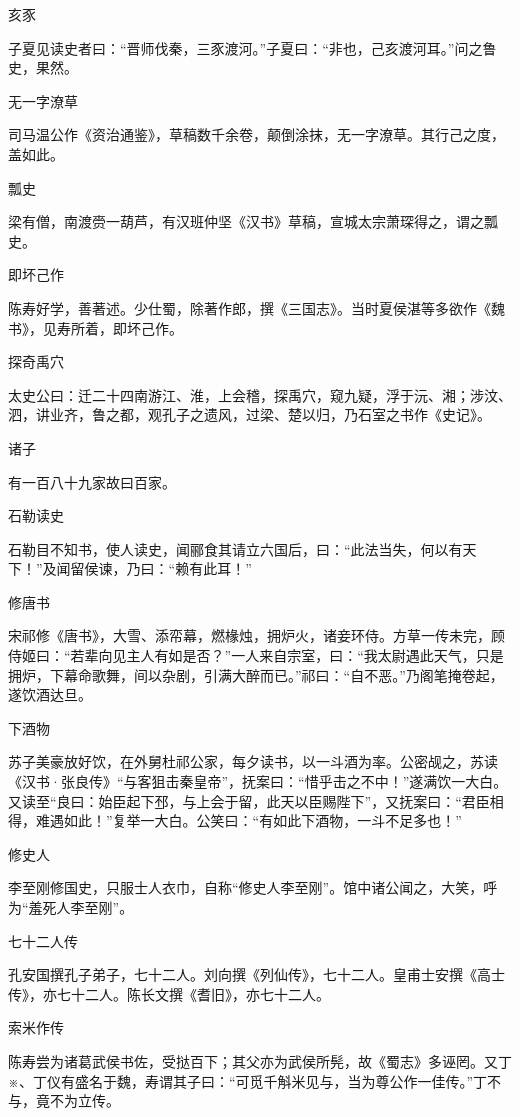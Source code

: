 \documentclass[a4paper,12pt,UTF8,twoside]{ctexbook}
\begin{document}
    亥豕
    
    子夏见读史者曰：“晋师伐秦，三豕渡河。”子夏曰：“非也，己亥渡河耳。”问之鲁史，果然。
    
    无一字潦草
    
    司马温公作《资治通鉴》，草稿数千余卷，颠倒涂抹，无一字潦草。其行己之度，盖如此。
    
    瓢史
    
    梁有僧，南渡赍一葫芦，有汉班仲坚《汉书》草稿，宣城太宗萧琛得之，谓之瓢史。
    
    即坏己作
    
    陈寿好学，善著述。少仕蜀，除著作郎，撰《三国志》。当时夏侯湛等多欲作《魏书》，见寿所着，即坏己作。
    
    探奇禹穴
    
    太史公曰：迁二十四南游江、淮，上会稽，探禹穴，窥九疑，浮于沅、湘；涉汶、泗，讲业齐，鲁之都，观孔子之遗风，过梁、楚以归，乃石室之书作《史记》。
    
    诸子
    
    有一百八十九家故曰百家。
    
    石勒读史
    
    石勒目不知书，使人读史，闻郦食其请立六国后，曰：“此法当失，何以有天下！”及闻留侯谏，乃曰：“赖有此耳！”
    
    修唐书
    
    宋祁修《唐书》，大雪、添帟幕，燃椽烛，拥炉火，诸妾环侍。方草一传未完，顾侍姬曰：“若辈向见主人有如是否？”一人来自宗室，曰：“我太尉遇此天气，只是拥炉，下幕命歌舞，间以杂剧，引满大醉而已。”祁曰：“自不恶。”乃阁笔掩卷起，遂饮酒达旦。
    
    下酒物
    
    苏子美豪放好饮，在外舅杜祁公家，每夕读书，以一斗酒为率。公密觇之，苏读《汉书·张良传》“与客狙击秦皇帝”，抚案曰：“惜乎击之不中！”遂满饮一大白。又读至“良曰：始臣起下邳，与上会于留，此天以臣赐陛下”，又抚案曰：“君臣相得，难遇如此！”复举一大白。公笑曰：“有如此下酒物，一斗不足多也！”
    
    修史人
    
    李至刚修国史，只服士人衣巾，自称“修史人李至刚”。馆中诸公闻之，大笑，呼为“羞死人李至刚”。
    
    七十二人传
    
    孔安国撰孔子弟子，七十二人。刘向撰《列仙传》，七十二人。皇甫士安撰《高士传》，亦七十二人。陈长文撰《耆旧》，亦七十二人。
    
    索米作传
    
    陈寿尝为诸葛武侯书佐，受挞百下；其父亦为武侯所髡，故《蜀志》多诬罔。又丁※、丁仪有盛名于魏，寿谓其子曰：“可觅千斛米见与，当为尊公作一佳传。”丁不与，竟不为立传。
    
\end{document}
